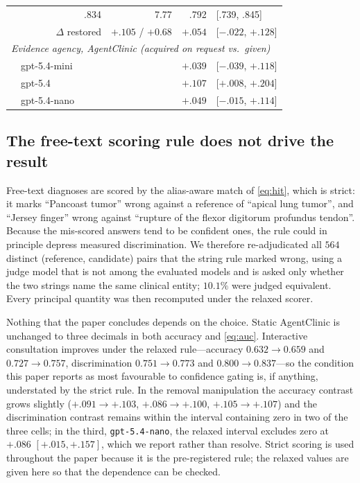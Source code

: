 \documentclass[journal,twoside]{IEEEtran}
\begin{document}
\begin{table}[!htb]
{\begin{tabular}{llrrrl}
& & .834 & 7.77 & .792 & [.739, .845] \\
& \multicolumn{2}{r}{$\Delta$ restored} & $+.105$ / $+0.68$ & $+.054$ & [$-.022$, $+.128$] \\
\midrule
\multicolumn{6}{l}{\emph{Evidence agency, AgentClinic (acquired on request vs.\ given)}}\\
& gpt-5.4-mini & \multicolumn{2}{r}{} & $+.039$ & [$-.039$, $+.118$] \\
& gpt-5.4 & \multicolumn{2}{r}{} & $\mathbf{+.107}$ & [$+.008$, $+.204$] \\
& gpt-5.4-nano & \multicolumn{2}{r}{} & $+.049$ & [$-.015$, $+.114$] \\
\bottomrule
\end{tabular}}
\end{table}


\subsection{The free-text scoring rule does not drive the result}
Free-text diagnoses are scored by the alias-aware match of \eqref{eq:hit}, which is strict: it marks
``Pancoast tumor'' wrong against a reference of ``apical lung tumor'', and ``Jersey finger'' wrong
against ``rupture of the flexor digitorum profundus tendon''. Because the mis-scored answers tend to
be confident ones, the rule could in principle depress measured discrimination. We therefore
re-adjudicated all $564$ distinct (reference, candidate) pairs that the string rule marked wrong,
using a judge model that is not among the evaluated models and is asked only whether the two strings
name the same clinical entity; $10.1\%$ were judged equivalent. Every principal quantity was then
recomputed under the relaxed scorer.

Nothing that the paper concludes depends on the choice. Static AgentClinic is unchanged to three
decimals in both accuracy and \eqref{eq:auc}. Interactive consultation improves under the relaxed
rule---accuracy $0.632 \to 0.659$ and $0.727 \to 0.757$, discrimination $0.751 \to 0.773$ and
$0.800 \to 0.837$---so the condition this paper reports as most favourable to confidence gating is,
if anything, understated by the strict rule. In the removal manipulation the accuracy contrast grows
slightly ($+.091 \to +.103$, $+.086 \to +.100$, $+.105 \to +.107$) and the discrimination contrast
remains within the interval containing zero in two of the three cells; in the third,
\texttt{gpt-5.4-nano}, the relaxed interval excludes zero at $+.086$ $[+.015,+.157]$, which we report
rather than resolve. Strict scoring is used throughout the paper because it is the pre-registered
rule; the relaxed values are given here so that the dependence can be checked.
\end{document}
